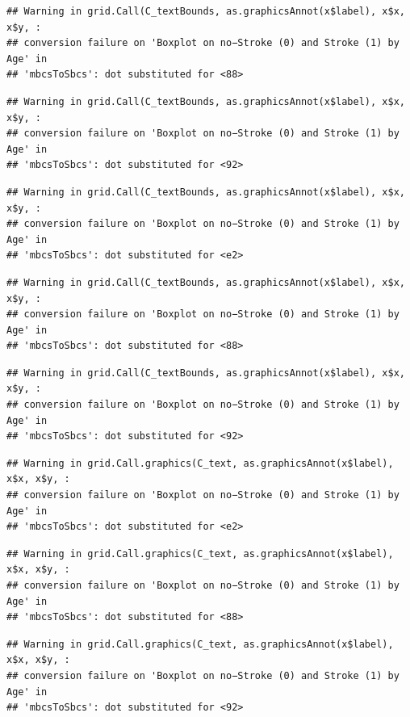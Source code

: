 \documentclass[
]{article}
\renewcommand{\=}[1]{\stackrel{#1}{=}}
\theoremstyle{definition}
\theoremstyle{remark}
\begin{document}
\begin{verbatim}
## Warning in grid.Call(C_textBounds, as.graphicsAnnot(x$label), x$x, x$y, :
## conversion failure on 'Boxplot on no−Stroke (0) and Stroke (1) by Age' in
## 'mbcsToSbcs': dot substituted for <88>
\end{verbatim}

\begin{verbatim}
## Warning in grid.Call(C_textBounds, as.graphicsAnnot(x$label), x$x, x$y, :
## conversion failure on 'Boxplot on no−Stroke (0) and Stroke (1) by Age' in
## 'mbcsToSbcs': dot substituted for <92>
\end{verbatim}

\begin{verbatim}
## Warning in grid.Call(C_textBounds, as.graphicsAnnot(x$label), x$x, x$y, :
## conversion failure on 'Boxplot on no−Stroke (0) and Stroke (1) by Age' in
## 'mbcsToSbcs': dot substituted for <e2>
\end{verbatim}

\begin{verbatim}
## Warning in grid.Call(C_textBounds, as.graphicsAnnot(x$label), x$x, x$y, :
## conversion failure on 'Boxplot on no−Stroke (0) and Stroke (1) by Age' in
## 'mbcsToSbcs': dot substituted for <88>
\end{verbatim}

\begin{verbatim}
## Warning in grid.Call(C_textBounds, as.graphicsAnnot(x$label), x$x, x$y, :
## conversion failure on 'Boxplot on no−Stroke (0) and Stroke (1) by Age' in
## 'mbcsToSbcs': dot substituted for <92>
\end{verbatim}

\begin{verbatim}
## Warning in grid.Call.graphics(C_text, as.graphicsAnnot(x$label), x$x, x$y, :
## conversion failure on 'Boxplot on no−Stroke (0) and Stroke (1) by Age' in
## 'mbcsToSbcs': dot substituted for <e2>
\end{verbatim}

\begin{verbatim}
## Warning in grid.Call.graphics(C_text, as.graphicsAnnot(x$label), x$x, x$y, :
## conversion failure on 'Boxplot on no−Stroke (0) and Stroke (1) by Age' in
## 'mbcsToSbcs': dot substituted for <88>
\end{verbatim}

\begin{verbatim}
## Warning in grid.Call.graphics(C_text, as.graphicsAnnot(x$label), x$x, x$y, :
## conversion failure on 'Boxplot on no−Stroke (0) and Stroke (1) by Age' in
## 'mbcsToSbcs': dot substituted for <92>
\end{verbatim}
\end{document}
